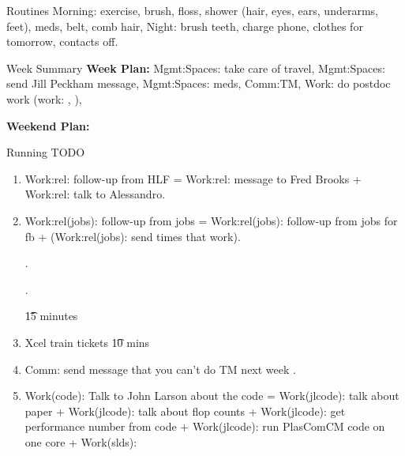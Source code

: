 \begin{frame}
\begin{columns}
\begin{column}{0.50\linewidth}
      \begin{block}{Routines}
        Morning: exercise, brush, floss, shower (hair, eyes, ears,
        underarms, feet), meds,  belt, comb hair,  Night: brush teeth, charge
        phone, clothes for tomorrow, contacts off. 
      \end{block}

      \begin{block}{Week Summary}
        {\tiny \textbf{Week Plan:} Mgmt:Spaces: take care of travel,
          Mgmt:Spaces: send Jill Peckham message, Mgmt:Spaces: meds,
          Comm:TM, Work: do postdoc work (work: ,  ),  } 

        {\tiny \textbf{Weekend Plan:}   }
      \end{block}

      \begin{block}{Running TODO} %
        \begin{enumerate}

        \item \small Work:rel:  follow-up from HLF = Work:rel: message to
          Fred Brooks + Work:rel: talk to Alessandro. 

        \item \small Work:rel(jobs): follow-up from jobs = Work:rel(jobs):
          follow-up from jobs for fb + (Work:rel(jobs): send times that
          work). 
          

         .


          
         .

       \t{15 minutes} 

      \item \tiny Xcel train tickets \t{10 mins} 

      \item \small Comm: send message that you can't do TM next
        week .
        
      \item \tiny Work(code): Talk to John Larson about the code  =
        Work(jlcode): talk about paper + Work(jlcode): talk about flop
        counts + Work(jlcode): get performance number from code + 
        Work(jlcode): run PlasComCM code on one core + Work(slds): 


\end{enumerate}
\end{block}
\end{column}
\end{columns}
\end{frame}
